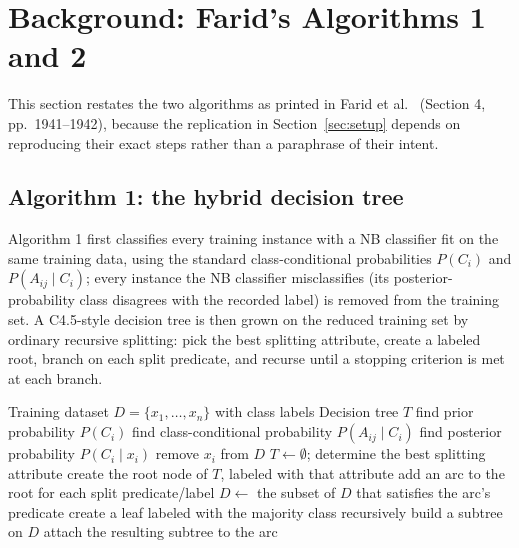 \section{Background: Farid's Algorithms 1 and 2}
\label{sec:background}

This section restates the two algorithms as printed in
Farid et al.~\cite{farid2014hybrid} (Section 4, pp.~1941--1942), because
the replication in Section~\ref{sec:setup} depends on reproducing their
exact steps rather than a paraphrase of their intent.

\subsection{Algorithm 1: the hybrid decision tree}

Algorithm 1 first classifies every training instance with a NB classifier
fit on the same training data, using the standard class-conditional
probabilities $P(C_i)$ and $P(A_{ij}\mid C_i)$; every instance the NB
classifier misclassifies (its posterior-probability class disagrees with
the recorded label) is removed from the training set. A C4.5-style
decision tree is then grown on the reduced training set by ordinary
recursive splitting: pick the best splitting attribute, create a labeled
root, branch on each split predicate, and recurse until a stopping
criterion is met at each branch.

\begin{algorithm}[t]
\caption{Hybrid decision tree induction (Farid et al.~\cite{farid2014hybrid}, Alg.\ 1)}
\label{alg:1}
\begin{algorithmic}[1]
\Require Training dataset $D=\{x_1,\dots,x_n\}$ with class labels
\Ensure Decision tree $T$
  \State find prior probability $P(C_i)$
\EndFor
{}
  \State find class-conditional probability $P(A_{ij}\mid C_i)$
\EndFor
{}
  \State find posterior probability $P(C_i\mid x_i)$
    \State remove $x_i$ from $D$
  \EndIf
\EndFor
\State $T \gets \emptyset$; determine the best splitting attribute
\State create the root node of $T$, labeled with that attribute
\State add an arc to the root for each split predicate/label
  \State $D \gets$ the subset of $D$ that satisfies the arc's predicate
    \State create a leaf labeled with the majority class
  \Else
    \State recursively build a subtree on $D$
  \EndIf
  \State attach the resulting subtree to the arc
\EndFor
\end{algorithmic}
\end{algorithm}

